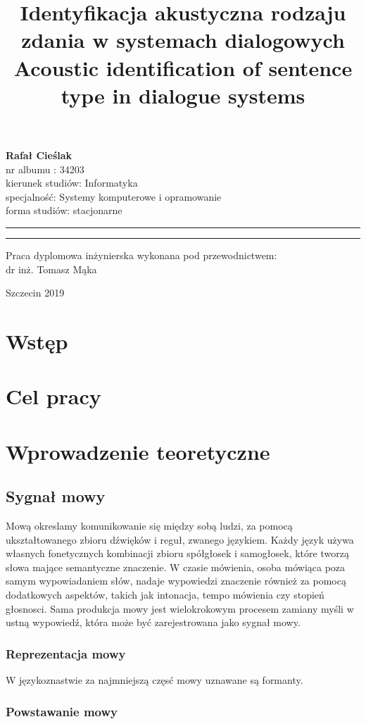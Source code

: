 \documentclass[a4paper,12 pt]{article}
\title{Identyfikacja akustyczna rodzaju zdania w systemach dialogowych	\newline \newline Acoustic identification of sentence type in dialogue systems	}
\makeatletter
\newcommand{\linia}{\rule{\linewidth}{0.4mm}}
\renewcommand{\maketitle}{\begin{titlepage}
    \vspace*{1cm}
    \begin{center}\small
   \textbf{ Rafał Cieślak}\\
    nr albumu : 34203\\
    kierunek studiów: Informatyka\\
    specjalność: Systemy komputerowe i opramowanie\\
    forma studiów: stacjonarne
    \end{center}
    \vspace{3cm}
    \noindent\linia
    \begin{center}
      \textbf{ \textsc{\@title}}
         \end{center}
     \linia
    \vspace{0.5cm}
    \begin{flushright}

    \vspace{5cm}
        \begin{center}\small
     {\small Praca dyplomowa inżynierska wykonana pod przewodnictwem:}\\
         dr inż. Tomasz Mąka
             \end{center}
     \end{flushright}
    \vspace*{\stretch{6}}
    \begin{center}
   Szczecin 2019
    \end{center}
  \end{titlepage}%
}
\makeatother
\begin{document}
\maketitle




\newpage
\tableofcontents
\listoffigures
\listoftables

\listofmycapequs

\newpage
\section{Wstęp}

\newpage
\section{Cel pracy}

\newpage
\section{Wprowadzenie teoretyczne}
\subsection{Sygnał mowy}
Mową okreslamy komunikowanie się między sobą ludzi, za pomocą ukształtowanego zbioru dźwięków i reguł, zwanego językiem. Każdy język używa własnych fonetycznych kombinacji zbioru spółgłosek i samogłosek, które tworzą słowa mające semantyczne znaczenie. W czasie mówienia, osoba mówiąca poza samym wypowiadaniem słów, nadaje wypowiedzi znaczenie również za pomocą dodatkowych aspektów, takich jak intonacja, tempo mówienia czy stopień głosnosci.
Sama produkcja mowy jest wielokrokowym procesem zamiany myśli w ustną wypowiedź, która może być zarejestrowana jako sygnał mowy.
\subsubsection{Reprezentacja mowy}
W językoznastwie za najmniejszą częsć mowy uznawane są formanty.
\subsubsection{Powstawanie mowy}
\end{document}
